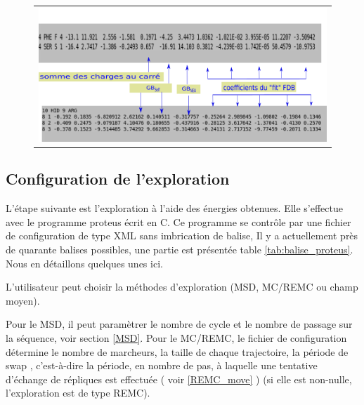 \begin{enumerate}
   \begin{figure}[!htbp]
     \centering
     \begin{tabular}{c}
       \includegraphics[width=12cm]{figure/proteus/inputenerGB.png} 
     \end{tabular}     
     \caption{}
\label{fig:GBenerfile}
   \end{figure}
   

\subsection{Configuration de l'exploration }

L'étape suivante est l'exploration à l'aide des énergies obtenues. Elle s'effectue avec le programme proteus écrit en C. Ce programme se contrôle par une fichier de configuration de type XML sans imbrication de balise, Il y a actuellement près de quarante balises possibles, une partie est présentée table \ref{tab:balise_proteus}. Nous en détaillons quelques unes ici.

L'utilisateur peut choisir la méthodes d'exploration (MSD, MC/REMC ou champ moyen).

Pour le MSD, il peut paramètrer le nombre de cycle et le nombre de passage sur la séquence, voir section \ref{MSD}.
Pour le MC/REMC, le fichier de configuration détermine le nombre de marcheurs, la taille de chaque trajectoire, la période de \og swap \fg, c'est-à-dire la période, en nombre de pas, à laquelle une tentative d'échange de répliques est effectuée ( voir \ref{REMC_move} ) (si elle est non-nulle, l'exploration est de type REMC).


\end{enumerate}
